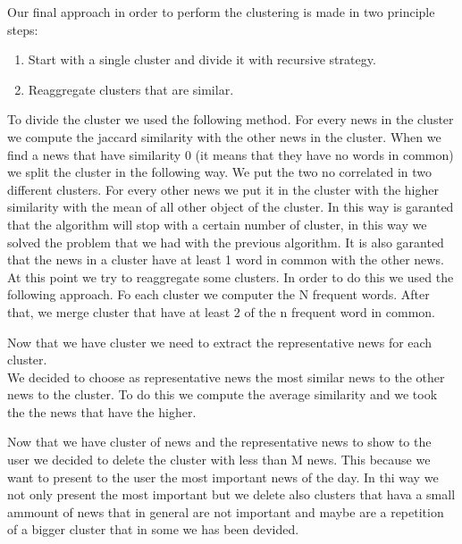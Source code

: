 \documentclass{acm_proc_article-sp}
\begin{document}
Our final approach in order to perform the clustering is made in two principle steps:
\begin{enumerate}
\item Start with a single cluster and divide it with recursive strategy.
\item Reaggregate clusters that are similar.
\end{enumerate}
To divide the cluster we used the following method. For every news in the cluster we compute the jaccard similarity with the other news in the cluster. When we find a news that have similarity 0 (it means that they have no words in common) we split the cluster in the following way. We put the two no correlated in two different clusters. For every other news we put it in the cluster with the higher similarity with the mean of all other object of the cluster. In this way is garanted that the algorithm will stop with a certain number of cluster, in this way we solved the problem that we had with the previous algorithm. It is also garanted that the news in a cluster have at least 1 word in common with the other news.\\
At this point we try to reaggregate some clusters. In order to do this we used the following approach. Fo each cluster we computer the N frequent words. After that, we merge cluster that have at least 2 of the n frequent word in common.

Now that we have cluster we need to extract the representative news for each cluster.\\
We decided to choose as representative news the most similar news to the other news to the cluster. To do this we compute the average similarity and we took the the news that have the higher.

Now that we have cluster of news and the representative news to show to the user we decided to delete the cluster with less than M news. This because we want to present to the user the most important news of the day. In thi way we not only present the most important but we delete also clusters that hava a small ammount of news that in general are not important and maybe are a repetition of a bigger cluster that in some we has been devided.
\end{document}
